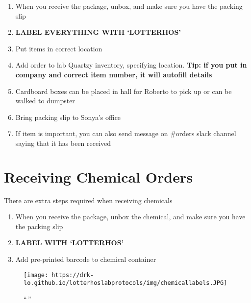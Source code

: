 \documentclass[
  letterpaper,
  DIV=11,
  numbers=noendperiod]{scrreprt}
\begin{document}
\begin{enumerate}
\def\labelenumi{\arabic{enumi}.}
\item
  When you receive the package, unbox, and make sure you have the
  packing slip
\item
  \textbf{LABEL EVERYTHING WITH `LOTTERHOS'}
\item
  Put items in correct location
\item
  Add order to lab Quartzy inventory, specifying location. \textbf{Tip:
  if you put in company and correct item number, it will autofill
  details}
\item
  Cardboard boxes can be placed in hall for Roberto to pick up or can be
  walked to dumpster
\item
  Bring packing slip to Sonya's office
\item
  If item is important, you can also send message on \#orders slack
  channel saying that it has been received
\end{enumerate}

\hypertarget{receiving-chemical-orders}{%
\section*{\texorpdfstring{\textbf{Receiving Chemical
Orders}}{Receiving Chemical Orders}}\label{receiving-chemical-orders}}


There are extra steps required when receiving chemicals

\begin{enumerate}
\def\labelenumi{\arabic{enumi}.}
\item
  When you receive the package, unbox the chemical, and make sure you
  have the packing slip
\item
  \textbf{LABEL WITH `LOTTERHOS'}
\item
  Add pre-printed barcode to chemical container
\end{enumerate}

\begin{figure}

{\centering \texttt{[image: https://drk-lo.github.io/lotterhoslabprotocols/img/chemicallabels.JPG]}

}

\caption{``\,''}

\end{figure}
\end{document}
